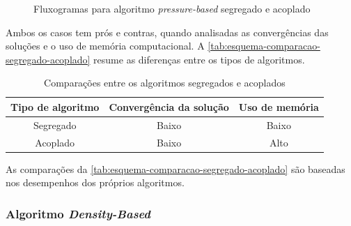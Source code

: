 \begin{figure}[!ht]
\caption{Fluxogramas para algoritmo \textit{pressure-based} segregado e acoplado \cite{fluent2021ansys}}
\label{flux:pressure-based}
\end{figure}

Ambos os casos tem prós e contras, quando analisadas as convergências das soluções e o uso de memória computacional. A \autoref{tab:esquema-comparacao-segregado-acoplado} resume as diferenças entre os tipos de algoritmos.

\begin{table}[ht]
\centering
\vspace{0.5cm}
\caption[Comparações entre os algoritmos segregados e acoplados]{Comparações entre os algoritmos segregados e acoplados}
\begin{tabular}[c]{c|c|c}
Tipo de algoritmo & Convergência da solução & Uso de memória \\
\hline
Segregado & Baixo & Baixo \\
Acoplado & Baixo & Alto
\end{tabular}
\label{tab:esquema-comparacao-segregado-acoplado}
\end{table}

As comparações da \autoref{tab:esquema-comparacao-segregado-acoplado} são baseadas nos desempenhos dos próprios algoritmos.

\subsubsection{Algoritmo \textit{Density-Based}}

